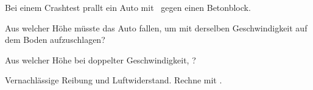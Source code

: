 Bei einem Crashtest prallt ein Auto mit \vO\ gegen einen Betonblock.

\begin{abcliste}
\abc
Aus welcher Höhe müsste das Auto fallen, um mit derselben Geschwindigkeit auf dem Boden aufzuschlagen?

\abc
Aus welcher Höhe bei doppelter Geschwindigkeit, \vbO?
\end{abcliste}

Vernachlässige Reibung und Luftwiderstand. Rechne mit \gO.
